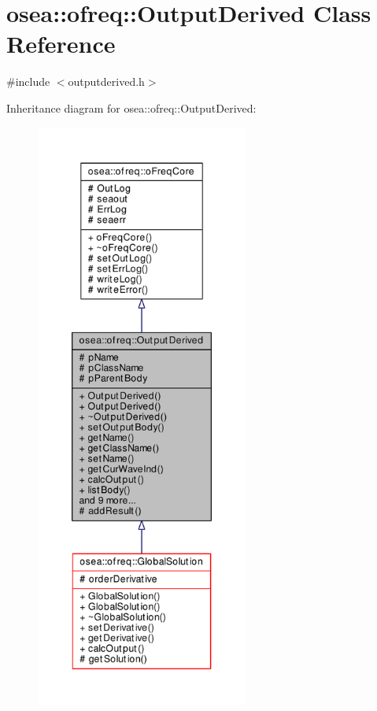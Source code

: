 \hypertarget{classosea_1_1ofreq_1_1_output_derived}{\section{osea\-:\-:ofreq\-:\-:Output\-Derived Class Reference}
\label{classosea_1_1ofreq_1_1_output_derived}
}


{\ttfamily \#include $<$outputderived.\-h$>$}



Inheritance diagram for osea\-:\-:ofreq\-:\-:Output\-Derived\-:
\nopagebreak
\begin{figure}[H]
\begin{center}
\leavevmode
\includegraphics[height=550pt]{classosea_1_1ofreq_1_1_output_derived__inherit__graph}
\end{center}
\end{figure}
